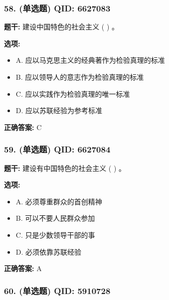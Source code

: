 \documentclass[12pt,UTF8]{ctexart}
\begin{document}
\subsubsection*{58. (单选题) \small QID: 6627083}

\textbf{题干:}
建设中国特色的社会主义  ( )  。

\textbf{选项:}
\begin{itemize}[leftmargin=*]

  \item A. 应以马克思主义的经典著作为检验真理的标准

  \item B. 应以领导人的意志作为检验真理的标准

  \item C. 应以实践作为检验真理的唯一标准

  \item D. 应以苏联经验为参考标准

\end{itemize}

\textbf{正确答案:}
C

\vspace{0.3em}\hrulefill\vspace{0.7em}

\subsubsection*{59. (单选题) \small QID: 6627084}

\textbf{题干:}
建设有中国特色的社会主义  ( )  。

\textbf{选项:}
\begin{itemize}[leftmargin=*]

  \item A. 必须尊重群众的首创精神

  \item B. 可以不要人民群众参加

  \item C. 只是少数领导干部的事

  \item D. 必须依靠苏联经验

\end{itemize}

\textbf{正确答案:}
A

\vspace{0.3em}\hrulefill\vspace{0.7em}

\subsubsection*{60. (单选题) \small QID: 5910728}
\end{document}
